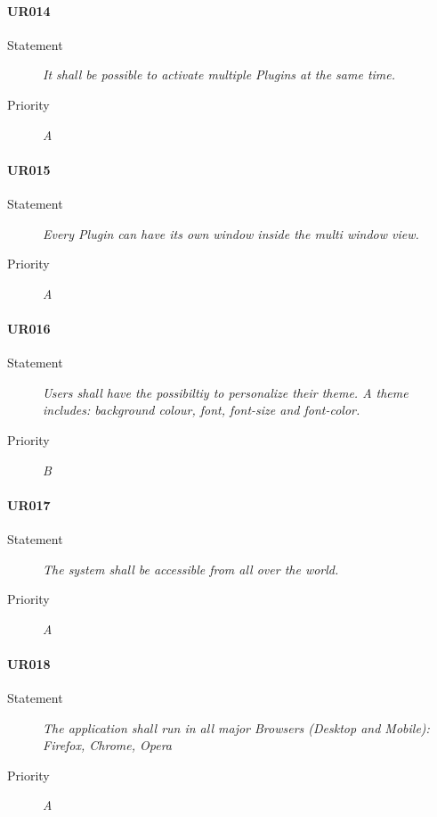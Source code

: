 \paragraph{UR014}
\begin{description}
\item[Statement] \textit{It shall be possible to activate multiple
    \gls{Plugins} at the same time.}
\item[Priority] \textit{A}
\end{description}

\paragraph{UR015}
\begin{description}
  \item[Statement]
    \textit{Every Plugin can have its own window inside the multi window view.}
  \item[Priority]
    \textit{A}
\end{description}

\paragraph{UR016}
\begin{description}
\item[Statement] \textit{Users shall have the possibiltiy to personalize
    their theme. A theme includes: background colour, font, font-size and
    font-color.}
\item[Priority] \textit{B}
\end{description}

\paragraph{UR017}
\begin{description}
\item[Statement] \textit{The system shall be accessible from all over the
    world.}
\item[Priority] \textit{A}
\end{description}

\paragraph{UR018}
\begin{description}
  \item[Statement]
    \textit{The application shall run in all major Browsers (Desktop
      and Mobile): Firefox,
      Chrome, Opera}
  \item[Priority]
    \textit{A}
\end{description}

